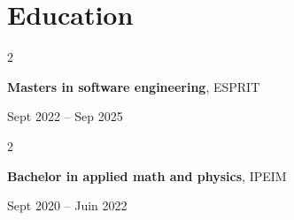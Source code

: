 \documentclass[10pt, letterpaper]{article}
\newenvironment{twocolentry}[2][]{
    \onecolentry
    \def\secondColumn{#2}
    \setcolumnwidth{\fill, 4.5 cm}
    \begin{paracol}{2}
}{
    \switchcolumn \raggedleft \secondColumn
    \end{paracol}
    \endonecolentry
} %
\begin{document}
            \section{Education}



        
        \begin{twocolentry}{
            Sept 2022 – Sep 2025
        }
            \textbf{Masters in software engineering}, ESPRIT
        \end{twocolentry}

        \vspace{0.10 cm}

                \begin{twocolentry}{
            Sept 2020 – Juin 2022
        }
            \textbf{Bachelor in applied math and physics}, IPEIM
          \end{twocolentry}


    
\end{document}
